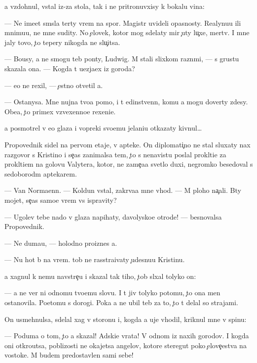 \documentclass[10pt]{book}
\begin{document}
{\Y}a vzdohnul, vstal iz-za stola, tak i ne pritronuvxisy k bokalu vina:

— Ne ime{\y}et sm{\yi}sla ter{\ia}ty vrem{\ia} na spor{\yi}. Magistr{\yi} uvideli opasnosty. Realynu{\y}u ili mnimu{\y}u, ne mne sudity. No {\c}elovek, kotor{\yi}{\y} mog sdelaty mir {\c}uty lu{\c}xe, mertv. I mne jaly tovo, {\c}to tepery nikogda ne slu{\c}itsa.

— Bo{\y}usy, {\y}a ne smogu teb{\ia} pon{\ia}ty, Ludwig. M{\yi} stali slixkom razn{\yi}mi, — s grust{\y}u skazala ona. — Kogda t{\yi} u{\y}ezja{\y}ex iz goroda?

— {\y}e{\x}o ne rexil, — {\c}estno otvetil {\y}a.

— Ostanysa. Mne nujna tvo{\y}a pomo{\x}, i t{\yi} {\y}edinstvenn{\yi}{\y}, komu {\y}a mogu dover{\ia}ty zdesy. Obe{\x}a{\y}, {\c}to primex vzvexenno{\y}e rexeni{\y}e.

{\Y}a posmotrel v {\y}e{\y}o glaza i vopreki svo{\y}emu jelani{\y}u otkazaty kivnul…

Propovednik sidel na pervom etaje, v apteke. On diplomati{\c}no ne stal sluxaty nax razgovor s Kristino{\y} i se{\y}{\c}as zanimalsa tem, {\c}to s nenavist{\y}u pos{\yi}lal prokl{\ia}ti{\y}e za prokl{\ia}ti{\y}em na golovu Valytera, kotor{\yi}{\y}, ne zame{\c}a{\y}a svetlo{\y} duxi, negromko besedoval s sedoborod{\yi}m aptekarem.

— Van Norma{\y}enn. — Koldun vstal, zakr{\yi}va{\y}a mne v{\yi}hod. — M{\yi} ploho na{\c}ali. B{\yi}ty mojet, se{\y}{\c}as samo{\y}e vrem{\ia} vs{\e} ispravity?

— Ugol{\y}ev tebe nado v glaza napihaty, d{\y}avolysko{\y}e otrod{\y}e! — besnovalsa Propovednik.

— Ne duma{\y}u, — holodno proiznes {\y}a.

— Nu hot{\ia} b{\yi} na vrem{\ia}. {\C}tob{\yi} ne rasstra{\y}ivaty {\c}udesnu{\y}u Kristinu.

{\Y}a xagnul k nemu navstre{\c}u i skazal tak tiho, {\c}tob{\yi} sl{\yi}xal tolyko on:

— {\Y}a ne ver{\iu} ni odnomu tvo{\y}emu slovu. I t{\yi} jiv tolyko potomu, {\c}to ona men{\ia} ostanovila. Poetomu s dorogi. Poka {\y}a ne ubil teb{\ia} za to, {\c}to t{\yi} delal so strajami.

On usmehnulsa, sdelal xag v storonu i, kogda {\y}a uje v{\yi}hodil, kriknul mne v spinu:

— Poduma{\y} o tom, {\c}to {\y}a skazal! Adski{\y}e vrata! V odnom iz naxih gorodov. I kogda oni otkro{\y}utsa, poblizosti ne okajetsa angelov, kotor{\yi}{\y}e steregut poko{\y} {\c}elove{\c}estva na vostoke. M{\yi} budem predostavlen{\yi} sami sebe!
\end{document}

